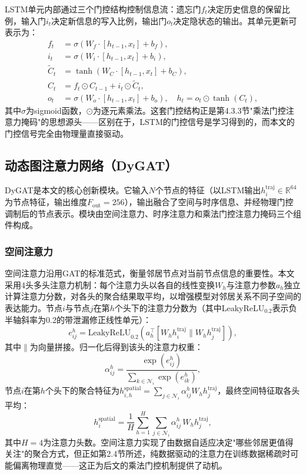 \documentclass[12pt,a4paper,UTF8]{ctexart}
\begin{document}
LSTM单元内部通过三个门控结构控制信息流：遗忘门$f_t$决定历史信息的保留比例，输入门$i_t$决定新信息的写入比例，输出门$o_t$决定隐状态的输出。其单元更新可表示为：
\begin{align}
f_t &= \sigma(W_f\cdot[h_{t-1},x_t]+b_f),\\
i_t &= \sigma(W_i\cdot[h_{t-1},x_t]+b_i),\\
\tilde{C}_t &= \tanh(W_C\cdot[h_{t-1},x_t]+b_C),\\
C_t &= f_t\odot C_{t-1} + i_t\odot\tilde{C}_t,\\
o_t &= \sigma(W_o\cdot[h_{t-1},x_t]+b_o),\quad h_t = o_t\odot\tanh(C_t),
\end{align}
其中$\sigma$为sigmoid函数，$\odot$为逐元素乘法。这套门控结构正是第4.3.3节"乘法门控注意力掩码"的思想源头——区别在于，LSTM的门控信号是学习得到的，而本文的门控信号完全由物理量直接驱动。

\subsection{动态图注意力网络（DyGAT）}

DyGAT是本文的核心创新模块。它输入$N$个节点的特征（以LSTM输出$h_i^{\text{traj}}\in\mathbb{R}^{64}$为节点特征，输出维度$F_{\text{out}}=256$），输出融合了空间与时序信息、并经物理门控调制后的节点表示。模块由空间注意力、时序注意力和乘法门控注意力掩码三个组件构成。

\subsubsection{空间注意力}

空间注意力沿用GAT的标准范式，衡量邻居节点对当前节点信息的重要性。本文采用4头多头注意力机制：每个注意力头以各自的线性变换$W_h$与注意力参数$a_h$独立计算注意力分数，对各头的聚合结果取平均，以增强模型对邻居关系不同子空间的表达能力。节点$i$与节点$j$在第$h$个头下的注意力分数为（其中LeakyReLU$_{0.2}$表示负半轴斜率为0.2的带泄漏修正线性单元）：
\begin{equation}
    e_{ij}^{h} = \text{LeakyReLU}_{0.2}\!\left(a_h^{\top}[W_h h_i^{\text{traj}} \parallel W_h h_j^{\text{traj}}]\right),
    \label{eq:spatial_score}
\end{equation}
其中$\parallel$为向量拼接。归一化后得到该头的注意力权重：
\begin{equation}
    \alpha_{ij}^{h} = \frac{\exp(e_{ij}^{h})}{\sum_{k\in\mathcal{N}_i}\exp(e_{ik}^{h})},
    \label{eq:spatial_softmax}
\end{equation}
节点$i$在第$h$个头下的聚合特征为$h_{i,h}^{\text{spatial}} = \sum_{j\in\mathcal{N}_i}\alpha_{ij}^{h} W_h h_j^{\text{traj}}$，最终空间特征取各头平均：
\begin{equation}
    h_i^{\text{spatial}} = \frac{1}{H}\sum_{h=1}^{H} \sum_{j\in\mathcal{N}_i}\alpha_{ij}^{h}\, W_h h_j^{\text{traj}},
    \label{eq:spatial_agg}
\end{equation}
其中$H=4$为注意力头数。空间注意力实现了由数据自适应决定"哪些邻居更值得关注"的聚合方式，但正如第2.4节所述，纯数据驱动的注意力在训练数据稀疏时可能偏离物理直觉——这正为后文的乘法门控机制提供了动机。
\end{document}
